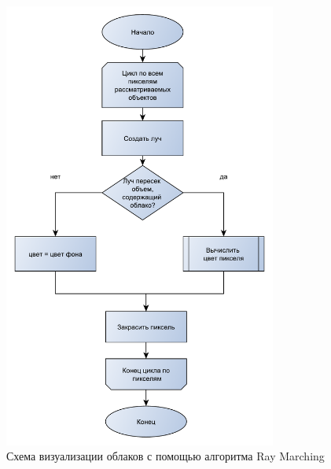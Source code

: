 \begin{figure}
	\centering
	\includegraphics[width=0.8\textwidth]{assets/img/rs1.pdf} %
	\caption{Схема визуализации облаков с помощью алгоритма Ray Marching}
	\label{fig:renderschememain}
\end{figure}

